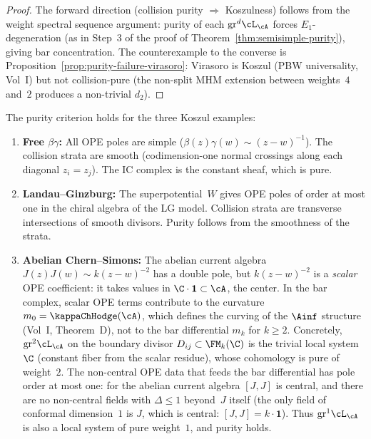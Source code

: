 \begin{proof}
The forward direction (collision purity $\Rightarrow$ Koszulness)
follows from the weight spectral sequence argument: purity of each
$\mathrm{gr}^d\cL_{\cA}$ forces $E_1$-degeneration (as in
Step~3 of the proof of Theorem~\ref{thm:semisimple-purity}), giving
bar concentration. The counterexample to the converse is
Proposition~\ref{prop:purity-failure-virasoro}: Virasoro is Koszul
(PBW universality, Vol~I) but not collision-pure (the non-split
MHM extension between weights~$4$ and~$2$ produces a non-trivial
$d_2$).
\end{proof}

\begin{proposition}
\label{prop:purity-koszul-examples}
The purity criterion holds for the three Koszul examples:
\begin{enumerate}[label=\textup{(\roman*)}]
\item \textbf{Free $\beta\gamma$:} All OPE poles are simple
 ($\beta(z)\gamma(w) \sim (z-w)^{-1}$). The collision strata
 are smooth (codimension-one normal crossings along each
 diagonal $z_i = z_j$). The IC complex is the constant sheaf,
 which is pure.

\item \textbf{Landau--Ginzburg:} The superpotential~$W$ gives
 OPE poles of order at most one in the chiral algebra of the
 LG model. Collision strata are transverse intersections of
 smooth divisors. Purity follows from the smoothness of the
 strata.

\item \textbf{Abelian Chern--Simons:} The abelian current algebra
 $J(z)J(w) \sim k(z-w)^{-2}$ has a double pole, but $k(z-w)^{-2}$
 is a \emph{scalar} OPE coefficient: it takes values in $\C \cdot
 \mathbf{1} \subset \cA$, the center. In the bar complex, scalar
 OPE terms contribute to the curvature $m_0 = \kappaChHodge(\cA)$, which
 defines the curving of the $\Ainf$ structure
 (Vol~I, Theorem~D), not to the bar differential $m_k$ for
 $k \geq 2$. Concretely, $\mathrm{gr}^2\cL_{\cA}$ on the
 boundary divisor $D_{ij} \subset \FM_k(\C)$ is the trivial local
 system $\C$ (constant fiber from the scalar residue), whose
 cohomology is pure of weight~$2$. The non-central OPE data
 that feeds the bar differential has pole order at most one:
 for the abelian current algebra $[J,J]$ is central, and there
 are no non-central fields with $\Delta \leq 1$ beyond~$J$ itself
 (the only field of conformal dimension~$1$ is $J$, which is central: $[J,J] = k\cdot\mathbf{1}$).
 Thus $\mathrm{gr}^1\cL_{\cA}$ is also a local system of pure
 weight~$1$, and purity holds.
\end{enumerate}
\end{proposition}

